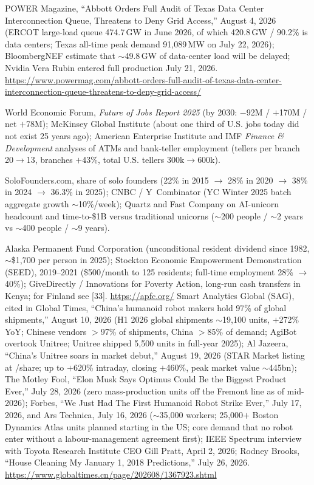 \documentclass[11pt,a4paper]{article}
\begin{document}
\noindent [123] POWER Magazine, ``Abbott Orders Full Audit of Texas Data Center Interconnection Queue, Threatens to Deny Grid Access,'' August 4, 2026 (ERCOT large-load queue 474.7\,GW in June 2026, of which 420.8\,GW / 90.2\% is data centers; Texas all-time peak demand 91,089\,MW on July 22, 2026); BloombergNEF estimate that $\sim$49.8\,GW of data-center load will be delayed; Nvidia Vera Rubin entered full production July 21, 2026. \url{https://www.powermag.com/abbott-orders-full-audit-of-texas-data-center-interconnection-queue-threatens-to-deny-grid-access/}

\noindent [124] World Economic Forum, \textit{Future of Jobs Report 2025} (by 2030: $-$92M / $+$170M / net $+$78M); McKinsey Global Institute (about one third of U.S. jobs today did not exist 25 years ago); American Enterprise Institute and IMF \textit{Finance \& Development} analyses of ATMs and bank-teller employment (tellers per branch 20$\to$13, branches $+$43\%, total U.S. tellers 300k$\to$600k).

\noindent [125] SoloFounders.com, share of solo founders (22\% in 2015 $\to$ 28\% in 2020 $\to$ 38\% in 2024 $\to$ 36.3\% in 2025); CNBC / Y~Combinator (YC Winter 2025 batch aggregate growth $\sim$10\%/week); Quartz and Fast Company on AI-unicorn headcount and time-to-\$1B versus traditional unicorns ($\sim$200 people / $\sim$2 years vs $\sim$400 people / $\sim$9 years).

\noindent [126] Alaska Permanent Fund Corporation (unconditional resident dividend since 1982, $\sim$\$1,700 per person in 2025); Stockton Economic Empowerment Demonstration (SEED), 2019--2021 (\$500/month to 125 residents; full-time employment 28\% $\to$ 40\%); GiveDirectly / Innovations for Poverty Action, long-run cash transfers in Kenya; for Finland see [33]. \url{https://apfc.org/}
\noindent [127] Smart Analytics Global (SAG), cited in Global Times, ``China's humanoid robot makers hold 97\% of global shipments,'' August 10, 2026 (H1 2026 global shipments $\sim$19,100 units, $+$272\% YoY; Chinese vendors $>$97\% of shipments, China $>$85\% of demand; AgiBot overtook Unitree; Unitree shipped 5,500 units in full-year 2025); Al Jazeera, ``China's Unitree soars in market debut,'' August 19, 2026 (STAR Market listing at /share; up to $+$620\% intraday, closing $+$460\%, peak market value $\sim$\textyen445bn); The Motley Fool, ``Elon Musk Says Optimus Could Be the Biggest Product Ever,'' July 28, 2026 (zero mass-production units off the Fremont line as of mid-2026); Forbes, ``We Just Had The First Humanoid Robot Strike Ever,'' July 17, 2026, and Ars Technica, July 16, 2026 ($\sim$35,000 workers; 25,000$+$ Boston Dynamics Atlas units planned starting in the US; core demand that no robot enter without a labour-management agreement first); IEEE Spectrum interview with Toyota Research Institute CEO Gill Pratt, April 2, 2026; Rodney Brooks, ``House Cleaning My January 1, 2018 Predictions,'' July 26, 2026. \url{https://www.globaltimes.cn/page/202608/1367923.shtml}
\end{document}
